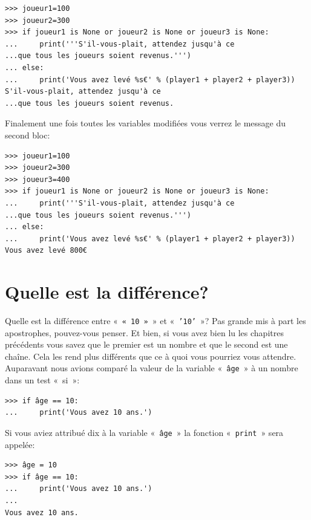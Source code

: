 \begin{Verbatim}[frame=single,rulecolor=\color{green}, label=à taper avec attention]
>>> joueur1=100
>>> joueur2=300
>>> if joueur1 is None or joueur2 is None or joueur3 is None:
...     print('''S'il-vous-plait, attendez jusqu'à ce 
...que tous les joueurs soient revenus.''')
... else:
...     print('Vous avez levé %s€' % (player1 + player2 + player3))
S'il-vous-plait, attendez jusqu'à ce 
...que tous les joueurs soient revenus.
\end{Verbatim}

Finalement une fois toutes les variables modifiées vous verrez le message du second bloc:

\begin{Verbatim}[frame=single,rulecolor=\color{green}, label=à taper avec attention]
>>> joueur1=100
>>> joueur2=300
>>> joueur3=400
>>> if joueur1 is None or joueur2 is None or joueur3 is None:
...     print('''S'il-vous-plait, attendez jusqu'à ce 
...que tous les joueurs soient revenus.''')
... else:
...     print('Vous avez levé %s€' % (player1 + player2 + player3))
Vous avez levé 800€
\end{Verbatim}

\section{Quelle est la différence?\label{sec:dif}}

Quelle est la différence entre « \texttt{« 10 »} » et « \texttt{'10'} »?
Pas grande mis à part les apostrophes, pouvez-vous penser. Et bien, si vous avez bien lu les chapitres précédents vous savez que le premier est un nombre et que le second est une chaîne. Cela les rend plus différents que ce à quoi vous pourriez vous attendre. Auparavant nous avions comparé la valeur de la variable « \texttt{âge} » à un nombre dans un test « si »:

\begin{Verbatim}[frame=single,rulecolor=\color{green}, label=à taper avec attention]
>>> if âge == 10:
...     print('Vous avez 10 ans.')
\end{Verbatim}

Si vous aviez attribué dix à la variable « \texttt{âge} »  la fonction « \texttt{print} »  sera appelée:

\begin{Verbatim}[frame=single,rulecolor=\color{green}, label=à taper avec attention]
>>> âge = 10
>>> if âge == 10:
...     print('Vous avez 10 ans.')
...
Vous avez 10 ans.
\end{Verbatim}


